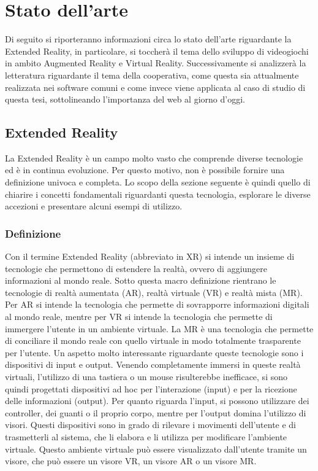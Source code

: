 \chapter{Stato dell'arte}\label{chap:Letteratura}
Di seguito si riporteranno informazioni circa lo stato dell'arte riguardante la Extended Reality, 
in particolare, si toccherà il tema dello sviluppo di videogiochi in ambito Augmented Reality e Virtual Reality. 
Successivamente si analizzerà la letteratura riguardante il tema della cooperativa, come questa sia attualmente 
realizzata nei software comuni e come invece viene applicata al caso di studio di questa tesi, 
sottolineando l'importanza del web al giorno d'oggi.

\section{Extended Reality}\label{sec:XR}
    La Extended Reality è un campo molto vasto che comprende diverse tecnologie ed è in continua 
    evoluzione. Per questo motivo, non è possibile fornire una definizione univoca e completa.
    Lo scopo della sezione seguente è quindi quello di chiarire i concetti fondamentali riguardanti questa 
    tecnologia, esplorare le diverse accezioni e presentare alcuni esempi di utilizzo.
    \subsection{Definizione}\label{subsec:XRDef}
        Con il termine Extended Reality (abbreviato in XR) si intende un insieme di tecnologie che 
        permettono di estendere la realtà, ovvero di aggiungere informazioni al mondo reale. Sotto 
        questa macro definizione rientrano le tecnologie di realtà aumentata (AR), realtà virtuale
        (VR) e realtà mista (MR). Per AR si intende la tecnologia che permette di sovrapporre
        informazioni digitali al mondo reale, mentre per VR si intende la tecnologia che permette
        di immergere l'utente in un ambiente virtuale. La MR è una tecnologia che permette di
        conciliare il mondo reale con quello virtuale in modo totalmente trasparente per l'utente. Un aspetto 
        molto interessante riguardante queste tecnologie sono i dispositivi di input e output. Venendo
        completamente immersi in queste realtà virtuali, l'utilizzo di una tastiera o un mouse risulterebbe 
        inefficace, si sono quindi progettati dispositivi ad hoc per l'interazione (input) e per
        la ricezione delle informazioni (output). Per quanto riguarda l'input, si possono utilizzare
        dei controller, dei guanti o il proprio corpo, mentre per l'output domina l'utilizzo di
        visori. Questi dispositivi sono in grado di rilevare i movimenti dell'utente e di trasmetterli 
        al sistema, che li elabora e li utilizza per modificare l'ambiente virtuale. Questo ambiente virtuale 
        può essere visualizzato dall'utente tramite un visore, che può essere un visore VR, un visore
        AR o un visore MR.
